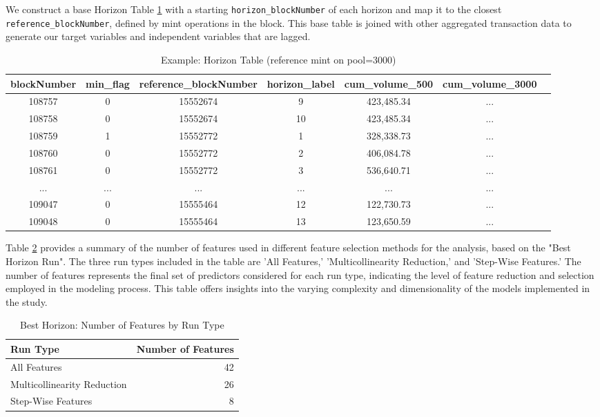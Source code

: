 \documentclass{article}
\begin{document}
We construct a base Horizon Table \ref{tab:horizon-table} with a starting \texttt{horizon\_blockNumber} of each horizon and map it to the closest \texttt{reference\_blockNumber}, defined by mint operations in the block. This base table is joined with other aggregated transaction data to generate our target variables and independent variables that are lagged.

\begin{table}[htbp]
  \centering
  \small
  \begin{tabular}{ccccccc}
    \hline
    \textbf{blockNumber} & \textbf{min\_flag} & \textbf{reference\_blockNumber} & \textbf{horizon\_label} & \textbf{cum\_volume\_500} & \textbf{cum\_volume\_3000} \\
    \hline
    108757 & 0 & 15552674 & 9 & 423,485.34 & ...\\
    108758 & 0 & 15552674 & 10 & 423,485.34 & ... \\
    108759 & 1 & 15552772 & 1 & 328,338.73 & ... \\
    108760 & 0 & 15552772 & 2 & 406,084.78 & ... \\
    108761 & 0 & 15552772 & 3 & 536,640.71 & ... \\
    ... & ... & ... & ... & ... & ... \\
    109047 & 0 & 15555464 & 12 & 122,730.73 & ... \\
    109048 & 0 & 15555464 & 13 & 123,650.59 & ... \\
    \hline
  \end{tabular}
  \caption{Example: Horizon Table (reference mint on pool=3000)}
  \label{tab:horizon-table}
\end{table}


Table \ref{tab:number-of-features} provides a summary of the number of features used in different feature selection methods for the analysis, based on the "Best Horizon Run". The three run types included in the table are 'All Features,' 'Multicollinearity Reduction,' and 'Step-Wise Features.' The number of features represents the final set of predictors considered for each run type, indicating the level of feature reduction and selection employed in the modeling process. This table offers insights into the varying complexity and dimensionality of the models implemented in the study.

\begin{table}[htbp]
  \centering
  \small
  \begin{tabular}{|l|r|}
    \hline
    \textbf{Run Type} & \textbf{Number of Features} \\
    \hline
    All Features & 42 \\
    Multicollinearity Reduction & 26 \\
    Step-Wise Features & 8 \\
    \hline
  \end{tabular}
  \caption{Best Horizon: Number of Features by Run Type}
  \label{tab:number-of-features}
\end{table}
\end{document}
